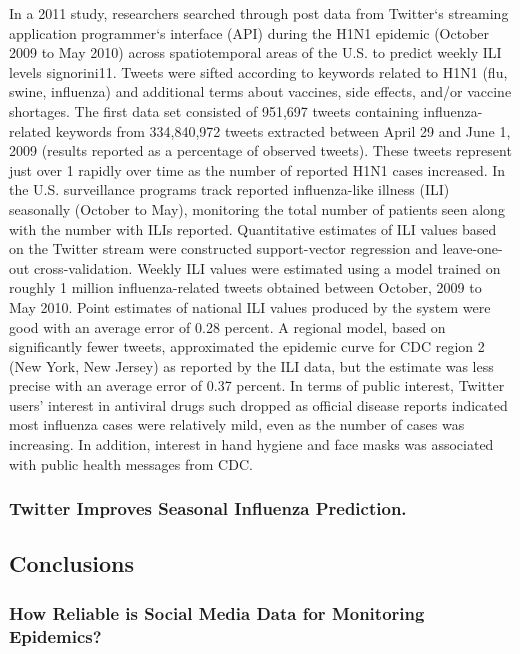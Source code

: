 \documentclass[sigconf]{acmart}
\begin{document}
In a 2011 study, researchers searched through post data from Twitter`s streaming 
application programmer`s interface (API) during the H1N1 epidemic (October 2009 to May 2010) 
across spatiotemporal areas of the U.S. to predict weekly ILI levels {signorini11}. Tweets 
were sifted according to keywords related to H1N1 (flu, swine, influenza) and additional 
terms about vaccines, side effects, and/or vaccine shortages. The first data set consisted 
of 951,697 tweets containing influenza-related keywords from 334,840,972 tweets extracted 
between April 29 and June 1, 2009 (results reported as a percentage of observed tweets). 
These tweets represent just over 1%
rapidly over time as the number of reported H1N1 cases increased. In the U.S. surveillance 
programs track reported influenza-like illness (ILI) seasonally (October to May), monitoring 
the total number of patients seen along with the number with ILIs reported. Quantitative 
estimates of ILI values based on the Twitter stream were constructed support-vector 
regression and leave-one-out cross-validation. Weekly ILI values were estimated using a 
model trained on roughly 1 million influenza-related tweets obtained between October, 2009 
to May 2010. Point estimates of national ILI values produced by the system were good with 
an average error of 0.28 percent. A regional model, based on significantly fewer tweets, 
approximated the epidemic curve for CDC region 2 (New York, New Jersey) as reported by the 
ILI data, but the estimate was less precise with an average error of 0.37 percent. In terms 
of public interest, Twitter users' interest in antiviral drugs such dropped as official 
disease reports indicated most influenza cases were relatively mild, even as the number of 
cases was increasing. In addition, interest in hand hygiene and face masks was associated 
with public health messages from CDC.

\subsubsection{Twitter Improves Seasonal Influenza Prediction. \cite{achrekar12}}




\subsection{Conclusions}


\subsubsection{How Reliable is Social Media Data for Monitoring Epidemics?}
\end{document}
